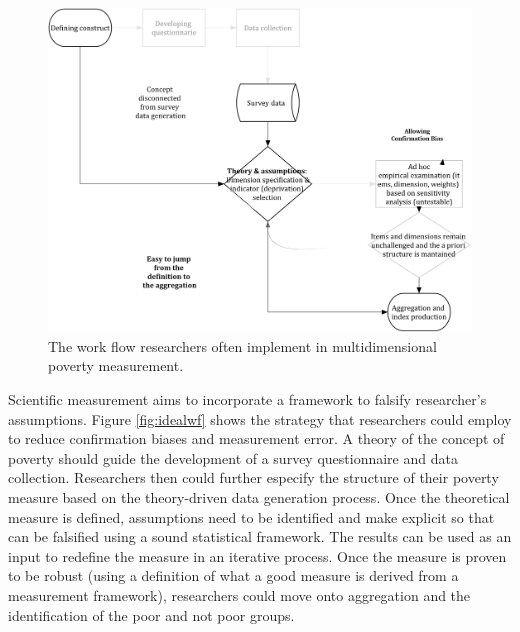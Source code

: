 \documentclass[]{book}
\begin{document}
\begin{figure}[H]

{\centering \includegraphics[width=\textwidth]{real_workflow} 

}

\caption{The work flow researchers often implement in multidimensional poverty measurement.}\label{fig:realwf}
\end{figure}

Scientific measurement aims to incorporate a framework to falsify researcher's assumptions. Figure \ref{fig:idealwf} shows the strategy that researchers could employ to reduce confirmation biases and measurement error. A theory of the concept of poverty should guide the development of a survey questionnaire and data collection. Researchers then could further especify the structure of their poverty measure based on the theory-driven data generation process. Once the theoretical measure is defined, assumptions need to be identified and make explicit so that can be falsified using a sound statistical framework. The results can be used as an input to redefine the measure in an iterative process. Once the measure is proven to be robust (using a definition of what a good measure is derived from a measurement framework), researchers could move onto aggregation and the identification of the poor and not poor groups.
\end{document}
